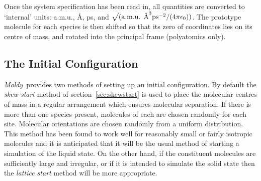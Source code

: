 \documentclass[a4paper,twoside]{report}
\newcommand{\moldy}{\emph{Moldy}}
\newcommand{\insqrt}{\sqrt{\mathstrut}}
\begin{document}
Once the system specification has been read in, all quantities are
converted to `internal' units: a.m.u., {\AA}, ps, and $\insqrt (
\textnormal{a.m.u. {\AA}}^{3} \textnormal{ps}^{-2}/(4 \pi \epsilon_{0}) )$.
The prototype molecule for each species is then shifted so that its
zero of coordinates lies on its centre of mass, and rotated into the
principal frame (polyatomics only).

\subsection{The Initial Configuration}

\moldy\  provides two methods of setting up an initial configuration.
By default the \emph{skew start} method of section~\ref{sec:skewstart}
is used to place the molecular centres of mass in a regular
arrangement which ensures molecular separation.  If there is more than
one species present, molecules of each are chosen randomly for each
site.  Molecular orientations are chosen randomly from a uniform
distribution.  This method has been found to work well for reasonably
small or fairly isotropic molecules and it is anticipated that it will
be the usual method of starting a simulation of the liquid state.   On
the other hand, if the constituent molecules are sufficiently large
and irregular, or if it is intended to simulate the solid state then
the \emph{lattice start} method will be more appropriate.
\end{document}
